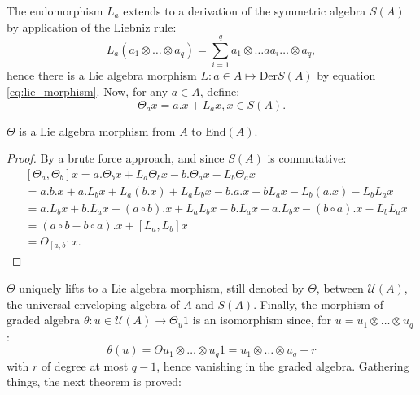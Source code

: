The endomorphism $L_a$ extends to a derivation of the symmetric algebra $S(A)$ by application of the Liebniz rule:
\begin{equation}
    \label{eq:der_la}
    L_a \left( a_1 \otimes \dots \otimes a_q \right)= \sum_{i=1}^q a_1 \otimes \dots a a_i \dots \otimes a_q,
\end{equation}
hence there is a Lie algebra morphism $L \colon a \in A \mapsto \text{Der}S\left( A \right)$ by equation \ref{eq:lie_morphism}.
Now, for any $a \in A$, define:
\begin{equation}
    \label{eq:theta_morphism}
    \Theta_a x = a. x + L_a x, x \in S\left( A \right).
\end{equation}
\begin{prop}
    \label{prop:theta_morphism}
    $\Theta$ is a Lie algebra morphism from $A$ to $\text{End}(A).$
\end{prop}
\begin{proof}
    By a brute force approach, and since $S(A)$ is commutative:
    \begin{equation}
        \begin{split}
            & \left[ \Theta_a, \Theta_b \right]  x = a .  \Theta_b x + L_a \Theta_b x - b .  \Theta_a x - L_b \Theta_a x \\
            &= a . b . x + a . L_b x + L_a (b. x) + L_a L_b x - b . a . x - b L_a x - L_b (a . x) - L_b L_a x \\
            &= a . L_b x + b . L_a x + (a \circ b) . x +  L_a L_b x - b . L_a x - a . L_b x - (b \circ a). x - L_b L_a x \\
            &= \left( a \circ b - b \circ a \right) . x + \left[ L_a, L_b \right] x \\
            & = \Theta_{[a,b]} x.
        \end{split}
    \end{equation}
\end{proof}
$\Theta$ uniquely lifts to a Lie algebra morphism, still denoted by $\Theta$, between $\mathcal{U}(A)$, the universal enveloping algebra of $A$ and $S(A)$.
Finally, the morphism of graded algebra $ \theta \colon u \in \mathcal{U}(A) \to \Theta_u 1$ is an isomorphism since, for $u=u_1 \otimes \dots \otimes u_q$:
\begin{equation}
    \theta(u)=\Theta{u_1 \otimes \dots \otimes u_q} 1 = u_1 \otimes \dots \otimes u_q + r
\end{equation}
with $r$ of degree at most $q-1$, hence vanishing in the graded algebra. Gathering things, the next theorem is proved:
